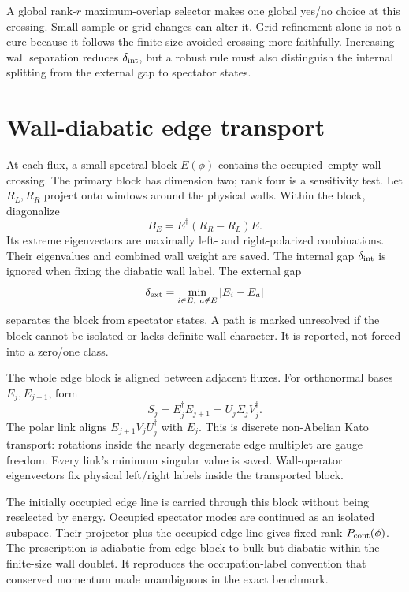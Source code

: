 \documentclass[aps,prb,twocolumn,floatfix,nofootinbib]{revtex4-2}
\begin{document}
A global rank-$r$ maximum-overlap selector makes one global yes/no choice at
this crossing.  Small sample or grid changes can alter it.  Grid refinement
alone is not a cure because it follows the finite-size avoided crossing more
faithfully.  Increasing wall separation reduces $\delta_{\rm int}$, but a
robust rule must also distinguish the internal splitting from the external
gap to spectator states.

\section{Wall-diabatic edge transport}

At each flux, a small spectral block $E(\phi)$ contains the occupied--empty
wall crossing.  The primary block has dimension two; rank four is a
sensitivity test.  Let $R_L,R_R$ project onto windows around the physical
walls.  Within the block, diagonalize
\begin{equation}
 B_E=E^\dagger(R_R-R_L)E .
 \label{eq:wall-operator}
\end{equation}
Its extreme eigenvectors are maximally left- and right-polarized
combinations.  Their eigenvalues and combined wall weight are saved.  The
internal gap $\delta_{\rm int}$ is ignored when fixing the diabatic wall
label.  The external gap
\begin{equation}
 \delta_{\rm ext}=\min_{i\in E,\ a\notin E}|E_i-E_a|
\end{equation}
separates the block from spectator states.  A path is marked unresolved if
the block cannot be isolated or lacks definite wall character.  It is
reported, not forced into a zero/one class.

The whole edge block is aligned between adjacent fluxes.  For orthonormal
bases $E_j,E_{j+1}$, form
\begin{equation}
 S_j=E_j^\dagger E_{j+1}=U_j\Sigma_jV_j^\dagger .
\end{equation}
The polar link aligns $E_{j+1}V_jU_j^\dagger$ with $E_j$.  This is discrete
non-Abelian Kato transport: rotations inside the nearly degenerate edge
multiplet are gauge freedom.  Every link's minimum singular value is saved.
Wall-operator eigenvectors fix physical left/right labels inside the
transported block.

The initially occupied edge line is carried through this block without being
reselected by energy.  Occupied spectator modes are continued as an isolated
subspace.  Their projector plus the occupied edge line gives fixed-rank
$P_{\rm cont}(\phi)$.  The prescription is adiabatic from edge block to bulk
but diabatic within the finite-size wall doublet.  It reproduces the
occupation-label convention that conserved momentum made unambiguous in the
exact benchmark.
\end{document}
